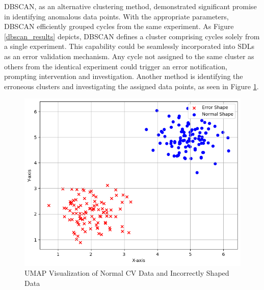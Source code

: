DBSCAN, as an alternative clustering method, demonstrated significant promise in identifying anomalous data points. With the appropriate parameters, DBSCAN efficiently grouped cycles from the same experiment. As Figure \ref{dbscan_results} depicts, DBSCAN defines a cluster comprising cycles solely from a single experiment. This capability could be seamlessly incorporated into SDLs as an error validation mechanism. Any cycle not assigned to the same cluster as others from the identical experiment could trigger an error notification, prompting intervention and investigation. Another method is identifying the erroneous clusters and investigating the assigned data points, as seen in Figure \ref{error_detection}.
\begin{figure}[h!]
  \centering
    \includegraphics[width=1.0\textwidth]{figures/error_detection.png}
    \caption{UMAP Visualization of Normal CV Data and Incorrectly Shaped Data}
    \label{error_detection}
\end{figure}

